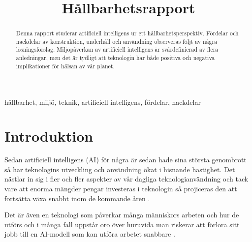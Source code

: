 \documentclass[conference]{IEEEtran}
\begin{document}
\title{Hållbarhetsrapport\\
}

\author{
}

\maketitle

\thispagestyle{plain}
\pagestyle{plain}

\begin{abstract}
Denna rapport studerar artificiell intelligens ur ett hållbarhetsperspektiv. Fördelar och nackdelar av konstruktion, underhåll och användning observeras följt av några lösningsförslag.
Miljöpåverkan av artificiell intelligens är svårdefinierad av flera anledningar, men det är tydligt att teknologin har både positiva och negativa implikationer för hälsan av vår planet.
\end{abstract}

\begin{IEEEkeywords}
hållbarhet, miljö, teknik, artificiell intelligens, fördelar, nackdelar
\end{IEEEkeywords}

\section{Introduktion}

Sedan artificiell intelligens (AI) för några är sedan hade sina största genombrott så har teknologins utveckling och användning ökat i hisnande hastighet. Det nästlar in sig i fler och fler aspekter av vår dagliga teknologianvändning \cite{b1} och tack vare att enorma mängder pengar investeras i teknologin så projiceras den att fortsätta växa snabbt inom de kommande åren \cite{b2}. 

Det är även en teknologi som påverkar många människors arbeten och hur de utförs och i många fall uppstår oro över huruvida man riskerar att förlora sitt jobb till en AI-modell som kan utföra arbetet snabbare \cite{b3}. 
\end{document}
